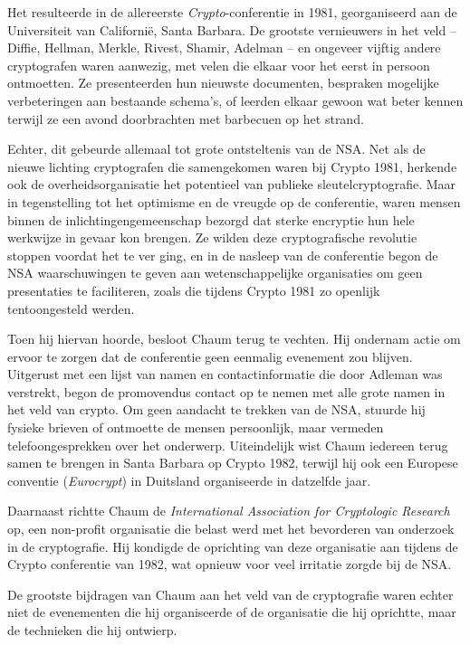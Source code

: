 \documentclass[
  a5paper,
  smalldemyvopaper,11pt,twoside,onecolumn,openright,extrafontsizes]{memoir}
\begin{document}
Het resulteerde in de allereerste \emph{Crypto}-conferentie in 1981,
georganiseerd aan de Universiteit van Californië, Santa Barbara. De
grootste vernieuwers in het veld -- Diffie, Hellman, Merkle, Rivest,
Shamir, Adelman -- en ongeveer vijftig andere cryptografen waren
aanwezig, met velen die elkaar voor het eerst in persoon ontmoetten. Ze
presenteerden hun nieuwste documenten, bespraken mogelijke verbeteringen
aan bestaande schema's, of leerden elkaar gewoon wat beter kennen
terwijl ze een avond doorbrachten met barbecuen op het strand.

Echter, dit gebeurde allemaal tot grote ontsteltenis van de NSA. Net als
de nieuwe lichting cryptografen die samengekomen waren bij Crypto 1981,
herkende ook de overheidsorganisatie het potentieel van publieke
sleutelcryptografie. Maar in tegenstelling tot het optimisme en de
vreugde op de conferentie, waren mensen binnen de
inlichtingengemeenschap bezorgd dat sterke encryptie hun hele werkwijze
in gevaar kon brengen. Ze wilden deze cryptografische revolutie stoppen
voordat het te ver ging, en in de nasleep van de conferentie begon de
NSA waarschuwingen te geven aan wetenschappelijke organisaties om geen
presentaties te faciliteren, zoals die tijdens Crypto 1981 zo openlijk
tentoongesteld werden.

Toen hij hiervan hoorde, besloot Chaum terug te vechten. Hij ondernam
actie om ervoor te zorgen dat de conferentie geen eenmalig evenement zou
blijven. Uitgerust met een lijst van namen en contactinformatie die door
Adleman was verstrekt, begon de promovendus contact op te nemen met alle
grote namen in het veld van crypto. Om geen aandacht te trekken van de
NSA, stuurde hij fysieke brieven of ontmoette de mensen persoonlijk,
maar vermeden telefoongesprekken over het onderwerp. Uiteindelijk wist
Chaum iedereen terug samen te brengen in Santa Barbara op Crypto 1982,
terwijl hij ook een Europese conventie (\emph{Eurocrypt}) in Duitsland
organiseerde in datzelfde jaar.

Daarnaast richtte Chaum de \emph{International Association for
Cryptologic Research} op, een non-profit organisatie die belast werd met
het bevorderen van onderzoek in de cryptografie. Hij kondigde de
oprichting van deze organisatie aan tijdens de Crypto conferentie van
1982, wat opnieuw voor veel irritatie zorgde bij de NSA.

De grootste bijdragen van Chaum aan het veld van de cryptografie waren
echter niet de evenementen die hij organiseerde of de organisatie die
hij oprichtte, maar de technieken die hij ontwierp.
\end{document}
